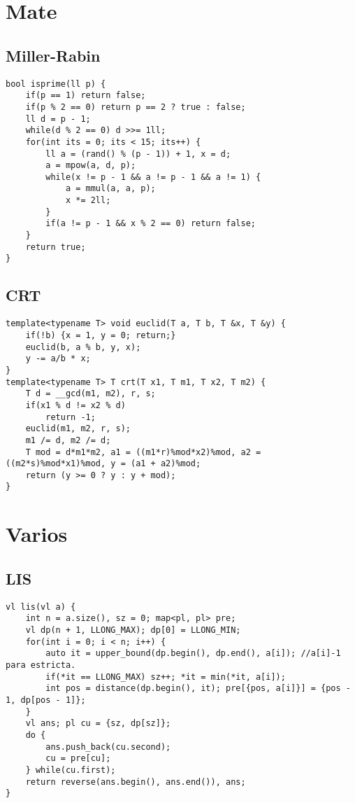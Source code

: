 \documentclass[twocolumn]{article}
\begin{document}
\section{Mate}
\subsection{Miller-Rabin}
\lstset{basicstyle=\footnotesize\ttfamily,breaklines=true,tabsize=2,language=C++,frame=leftline, numbers=left, numberstyle=\tiny, numbersep=5pt}
\begin{lstlisting}
bool isprime(ll p) {
	if(p == 1) return false;
	if(p % 2 == 0) return p == 2 ? true : false;
	ll d = p - 1;
	while(d % 2 == 0) d >>= 1ll;
	for(int its = 0; its < 15; its++) {
		ll a = (rand() % (p - 1)) + 1, x = d;
		a = mpow(a, d, p);
		while(x != p - 1 && a != p - 1 && a != 1) {
			a = mmul(a, a, p);
			x *= 2ll;
		}
		if(a != p - 1 && x % 2 == 0) return false;
	}
	return true;
}
\end{lstlisting}
\subsection{CRT}
\lstset{basicstyle=\footnotesize\ttfamily,breaklines=true,tabsize=2,language=C++,frame=leftline, numbers=left, numberstyle=\tiny, numbersep=5pt}
\begin{lstlisting}
template<typename T> void euclid(T a, T b, T &x, T &y) {
	if(!b) {x = 1, y = 0; return;}
	euclid(b, a % b, y, x);
	y -= a/b * x;
}
template<typename T> T crt(T x1, T m1, T x2, T m2) {
	T d = __gcd(m1, m2), r, s;
	if(x1 % d != x2 % d)
		return -1;
	euclid(m1, m2, r, s);
	m1 /= d, m2 /= d;
	T mod = d*m1*m2, a1 = ((m1*r)%mod*x2)%mod, a2 = ((m2*s)%mod*x1)%mod, y = (a1 + a2)%mod;
	return (y >= 0 ? y : y + mod);
}
\end{lstlisting}
\section{Varios}
\subsection{LIS}
\lstset{basicstyle=\footnotesize\ttfamily,breaklines=true,tabsize=2,language=C++,frame=leftline, numbers=left, numberstyle=\tiny, numbersep=5pt}
\begin{lstlisting}
vl lis(vl a) {
	int n = a.size(), sz = 0; map<pl, pl> pre;
	vl dp(n + 1, LLONG_MAX); dp[0] = LLONG_MIN;
	for(int i = 0; i < n; i++) {
		auto it = upper_bound(dp.begin(), dp.end(), a[i]); //a[i]-1 para estricta.
		if(*it == LLONG_MAX) sz++; *it = min(*it, a[i]);
		int pos = distance(dp.begin(), it); pre[{pos, a[i]}] = {pos - 1, dp[pos - 1]};
	}
	vl ans; pl cu = {sz, dp[sz]};
	do {
		ans.push_back(cu.second);
		cu = pre[cu];
	} while(cu.first);
	return reverse(ans.begin(), ans.end()), ans;
}
\end{lstlisting}
\end{document}
